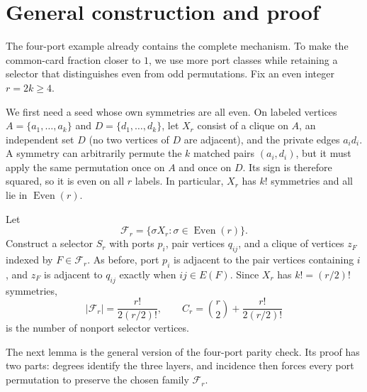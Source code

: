 \documentclass[11pt]{article}
\newcommand{\Even}{\operatorname{Even}}
\begin{document}
\section{General construction and proof}\label{sec:general}
The four-port example already contains the complete mechanism. To make the common-card fraction closer
to $1$, we use more port classes while retaining a selector that distinguishes even from odd
permutations. Fix an even integer $r=2k\ge4$.

We first need a seed whose own symmetries are all even. On labeled vertices
$A=\{a_1,\ldots,a_k\}$ and $D=\{d_1,\ldots,d_k\}$, let $X_r$ consist of a clique on $A$, an independent
set $D$ (no two vertices of $D$ are adjacent), and the private edges $a_i d_i$. A symmetry can
arbitrarily permute the $k$ matched pairs
$(a_i,d_i)$, but it must apply the same permutation once on $A$ and once on $D$. Its sign is therefore
squared, so it is even on all $r$ labels. In particular, $X_r$ has $k!$ symmetries and all lie in
$\Even(r)$.

Let
\[
 \mathcal F_r=\{\sigma X_r:\sigma\in\Even(r)\}.
\]
Construct a selector $S_r$ with ports $p_i$, pair vertices $q_{ij}$, and a clique of vertices $z_F$
indexed by $F\in\mathcal F_r$. As before, port $p_i$ is adjacent to the pair vertices containing $i$,
and $z_F$ is adjacent to $q_{ij}$ exactly when $ij\in E(F)$. Since $X_r$ has $k!=(r/2)!$
symmetries,
\[
 |\mathcal F_r|=\frac{r!}{2(r/2)!},\qquad
 C_r=\binom r2+\frac{r!}{2(r/2)!}
\]
is the number of nonport selector vertices.

The next lemma is the general version of the four-port parity check. Its proof has two parts: degrees
identify the three layers, and incidence then forces every port permutation to preserve the chosen
family $\mathcal F_r$.
\end{document}
